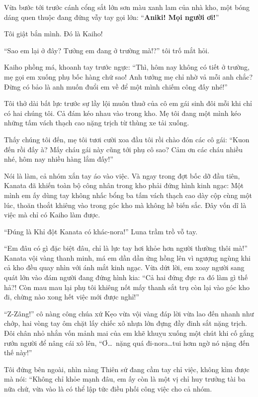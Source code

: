 \documentclass[../main.tex]{subfiles}
\begin{document}
Vừa bước tới trước cánh cổng sắt lớn sơn màu xanh lam của nhà kho, một bóng dáng quen thuộc đang đứng vẫy tay gọi lớn: ``\textbf{Aniki! Mọi người ơi!}''

Tôi giật bắn mình. Đó là Kaiho!

``Sao em lại ở đây? Tưởng em đang ở trường mà!?'' tôi trố mắt hỏi.

Kaiho phồng má, khoanh tay trước ngực: ``Thì, hôm nay không có tiết ở trường, mẹ gọi em xuống phụ bốc hàng chứ sao! Anh tưởng mẹ chỉ nhờ vả mỗi anh chắc? Đừng có bảo là anh muốn đuổi em về để một mình chiếm công đấy nhé!''

Tôi thở dài bất lực trước sự lầy lội muôn thuở của cô em gái sinh đôi mỗi khi chỉ có hai chúng tôi. Cả đám kéo nhau vào trong kho. Mẹ tôi đang một mình kéo những tấm vách thạch cao nặng trịch từ thùng xe tải xuống.

Thấy chúng tôi đến, mẹ tôi tươi cười xoa đầu tôi rồi chào đón các cô gái: ``Kuon đến rồi đấy à? Mấy cháu gái này cũng tới phụ cô sao? Cảm ơn các cháu nhiều nhé, hôm nay nhiều hàng lắm đấy!''

Nói là làm, cả nhóm xắn tay áo vào việc. Và ngay trong đợt bốc dỡ đầu tiên, Kanata đã khiến toàn bộ công nhân trong kho phải đứng hình kinh ngạc: Một mình em ấy dùng tay không nhấc bổng ba tấm vách thạch cao dày cộp cùng một lúc, thoăn thoắt khiêng vào trong góc kho mà không hề biến sắc. Đây vốn dĩ là việc mà chỉ có Kaiho làm được.

``Đúng là Khỉ đột Kanata có khác-nora!'' Luna trầm trồ vỗ tay.

``Em đâu có gì đặc biệt đâu, chỉ là lực tay hơi khỏe hơn người thường thôi mà!'' Kanata vội vàng thanh minh, má em dần dần ửng hồng lên vì ngượng ngùng khi cả kho đều quay nhìn với ánh mắt kinh ngạc. Vừa dứt lời, em xoay người sang quát lớn vào đám người đang đứng hình kia: ``Cả hai đứng đực ra đó làm gì thế hả?! Còn mau mau lại phụ tôi khiêng nốt mấy thanh sắt trụ còn lại vào góc kho đi, chừng nào xong hết việc mới được nghỉ!''

``Z-Zâng!'' cô nàng công chúa xứ Kẹo vừa vội vàng đáp lời vừa lao đến nhanh như chớp, hai vòng tay ôm chặt lấy chiếc xô nhựa lớn đựng đầy đinh sắt nặng trịch. Đôi chân nhỏ nhắn vốn mảnh mai của em khẽ khuỵu xuống một chút khi cố gắng rướn người để nâng cái xô lên, ``Ơ\dots\ nặng quá đi-nora\dots tui hơm ngờ nó nặng đến thế này!''

Tôi đứng bên ngoài, nhìn nàng Thiên sứ đang cầm tay chỉ việc, không kìm được mà nói: ``Không chỉ khỏe mạnh đâu, em ấy còn là một vị chỉ huy trưởng tài ba nữa chứ, vừa vào là có thể lập tức điều phối công việc cho cả nhóm.
\end{document}
